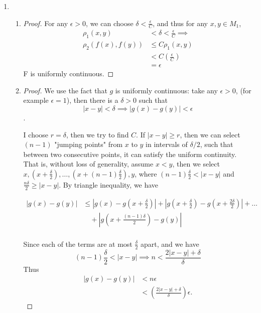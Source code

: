\documentclass[12pt, a4paper]{article}
\begin{document}
\begin{enumerate}
\begin{proof}
      Taking $N=\max\{N_1,N_2\}$, we have for any $n\geq N$,
      \[ \rho(y_{n_k},x)\leq\rho(y_{n_k},x_{n_k}) + \rho(x_{n_k},x) <
        \frac{\epsilon}{2}+\frac{\epsilon}{2}=\epsilon \]
      which shows that $\lim_{k\rightarrow\infty}{y_{n_k}} = x$.
    \end{proof}
  \item \begin{enumerate}
      \item \begin{proof} %
          For any $\epsilon>0$, we can choose $\delta<\frac{\epsilon}{C}$, and
          thus for any $x,y\in M_1$,
          \begin{align*}
            \rho_1(x,y)&<\delta<\frac{\epsilon}{C}\implies\\
            \rho_2(f(x),f(y))&\leq C\rho_1(x,y)\\
            &<C(\frac{\epsilon}{C})\\
            &=\epsilon
          \end{align*}
          F is uniformly continuous.
        \end{proof}
      \item \begin{proof}
          We use the fact that $g$ is uniformly continuous: take any
          $\epsilon>0$, (for example $\epsilon=1$), then there is a $\delta>0$
          such that
          \[ |x-y|<\delta \implies |g(x)-g(y)|<\epsilon \].

          I choose $r=\delta$, then we try to find $C$. If $|x-y|\geq r$, then
          we can select $(n-1)$ "jumping points" from $x$ to $y$ in intervals of
          $\delta/2$, such that between two consecutive points, it can satisfy
          the uniform continuity. That is, without loss of generality, assume
          $x<y$, then we select $x, (x+\frac{\delta}{2}), \dots,
          (x+(n-1)\frac{\delta}{2}),y$, where $(n-1)\frac{\delta}{2}<|x-y|$ and
          $\frac{n\delta}{2}\geq|x-y|$. By triangle inequality, we have

          \begin{align*}
            |g(x)-g(y)|&\leq|g(x)-g(x+\frac{\delta}{2})|
            +|g(x+\frac{\delta}{2})-g(x+\frac{2\delta}{2})|+\dots\\
            &\quad +|g(x+\frac{(n-1)\delta}{2})-g(y)|\\
          \end{align*}

          Since each of the terms are at most $\frac{\delta}{2}$ apart, and we
          have
          \[(n-1)\frac{\delta}{2}<|x-y| \implies
            n<\frac{2|x-y|+\delta}{\delta}\]
          Thus
          \begin{align*}
            |g(x)-g(y)|&<n\epsilon\\
            &<(\frac{2|x-y|+\delta}{\delta})\epsilon
          .\end{align*}


\end{proof}
\end{enumerate}
\end{enumerate}
\end{document}
